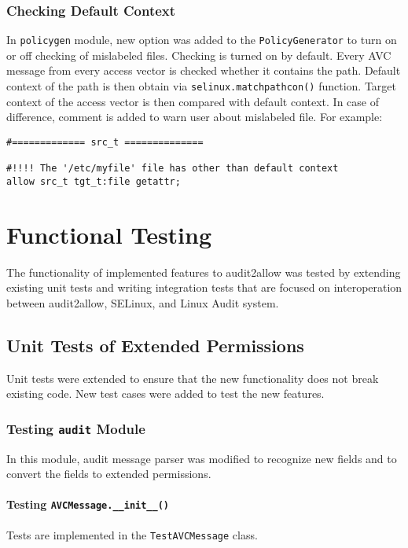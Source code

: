 \subsection{Checking Default Context}
In \texttt{policygen} module, new option was added to the
\texttt{PolicyGenerator} to turn on or off checking of mislabeled files.
Checking is turned on by default. Every AVC message from every access vector is
checked whether it contains the path. Default context of the path is then obtain
via \texttt{selinux.matchpathcon()} function. Target context of the access
vector is then compared with default context. In case of difference, comment is
added to warn user about mislabeled file. For example:
\begin{lstlisting}
#============= src_t ==============

#!!!! The '/etc/myfile' file has other than default context
allow src_t tgt_t:file getattr;
\end{lstlisting}

\chapter{Functional Testing}
The functionality of implemented features to audit2allow was tested by extending
existing unit tests and writing integration tests that are focused on
interoperation between audit2allow, SELinux, and Linux Audit system.

\section{Unit Tests of Extended Permissions}

Unit tests were extended to ensure that the new functionality does not break
existing code. New test cases were added to test the new features.

\subsection{Testing \texttt{audit} Module}
In this module, audit message parser was modified to recognize new fields and to
convert the fields to extended permissions.

\subsubsection{Testing \texttt{AVCMessage.\_\_init\_\_()}}
Tests are implemented in the \texttt{TestAVCMessage} class.

